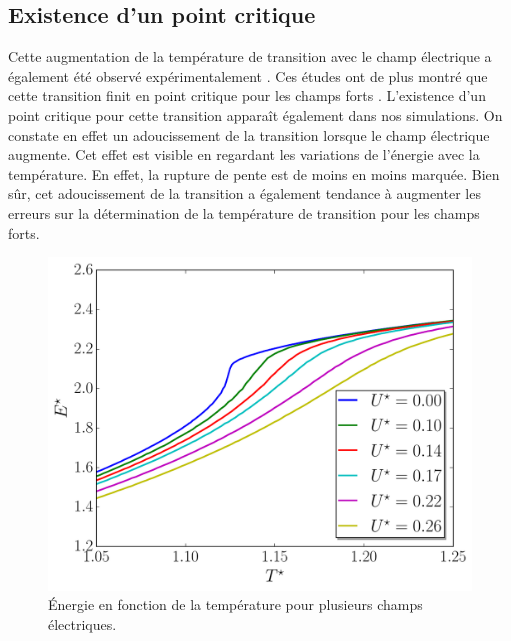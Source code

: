 \documentclass[11pt,a4paper]{article}
\numberwithin{equation}{section}
\begin{document}
\subsection{Existence d'un point critique}
Cette augmentation de la température de transition avec le champ électrique a également été observé expérimentalement \cite{mfieldExperiment,efieldExperiment,efieldExperiment2}. Ces études ont de plus montré que cette transition finit en point critique pour les champs forts \cite{efieldExperiment}. L'existence d'un point critique pour cette transition apparaît également dans nos simulations. On constate en effet un adoucissement de la transition lorsque le champ électrique augmente. Cet effet est visible en regardant les variations de l'énergie avec la température. En effet, la rupture de pente est de moins en moins marquée. Bien sûr, cet adoucissement de la transition a également tendance à augmenter les erreurs sur la détermination de la température de transition pour les champs forts.
\vspace{2cm}

\begin{figure}[h!]
    \centering	    
	\includegraphics[scale=0.6]{figures/electricField_calo.pdf}
    \caption{Énergie en fonction de la température pour plusieurs champs électriques.}
    	\label{deriveenergie} 
\end{figure}

\newpage
\end{document}
